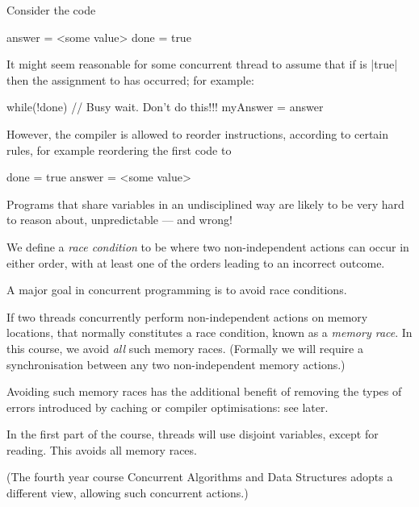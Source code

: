 \documentclass[notes,color]{sepslide0}
\begin{document}
\begin{slide}

Consider the code
%
\begin{scala}
answer = <some value>
done = true
\end{scala}
%
It might seem reasonable for some concurrent thread to assume that if
 is |true| then the assignment to  has occurred; for
example:
%
\begin{scala}
while(!done){ } // Busy wait.  Don't do this!!!
myAnswer = answer
\end{scala}
%
However, the compiler is allowed to reorder instructions, according to certain
rules, for example reordering the first code to
%
\begin{scala}
done = true
answer = <some value>
\end{scala}
\end{slide}


\begin{slide}

Programs that share variables in an undisciplined way are likely to be very
hard to reason about, unpredictable --- and wrong!

We define a \emph{race condition} to be where two non-independent actions can
occur in either order, with at least one of the orders leading to an incorrect
outcome.

A major goal in concurrent programming is to avoid race conditions. 
\end{slide}


\begin{slide}

If two threads concurrently perform non-independent actions on memory
locations, that normally constitutes a race condition, known as a \emph{memory
  race}.  In this course, we avoid \emph{all} such memory races.  (Formally we
will require a synchronisation between any two non-independent memory
actions.)

Avoiding such memory races has the additional benefit of removing the
types of errors introduced by caching or compiler optimisations: see later.

In the first part of the course, threads will use disjoint variables, except
for reading.  This avoids all memory races.

(The fourth year course Concurrent Algorithms and Data Structures adopts a
different view, allowing such concurrent actions.)
\end{slide}
\end{document}
